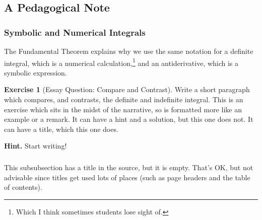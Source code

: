 \documentclass[10pt,]{article}
\theoremstyle{plain}
\theoremstyle{definition}
\theoremstyle{definition}
\theoremstyle{definition}
\theoremstyle{definition}
\theoremstyle{definition}
\theoremstyle{definition}
\newtheorem{exercise}[theorem]{Exercise}
\numberwithin{equation}{section}
\begin{document}
\subsection[{A Pedagogical Note}]{A Pedagogical Note}\label{subsection-2}
\typeout{************************************************}
\typeout{************************************************}
\subsubsection[{Symbolic and Numerical Integrals}]{Symbolic and Numerical Integrals}\label{subsubsection-different-integrals}
\hypertarget{p-47}{}%
The Fundamental Theorem explains why we use the same notation for a definite integral, which is a numerical calculation,\footnote{Which I think sometimes students lose sight of.\label{fn-2}} and an antiderivative, which is a symbolic expression.%
\begin{exercise}[{Essay Question: Compare and Contrast}]\label{exercise-essay}
\hypertarget{p-48}{}%
Write a short paragraph which compares, and contrasts, the definite and indefinite integral. This is an exercise which sits in the midst of the narrative, so is formatted more like an example or a remark.  It can have a hint and a solution, but this one does not.  It can have a title, which this one does.%
\par\smallskip%
\noindent\textbf{Hint.}\hypertarget{hint-1}{}\quad%
\hypertarget{p-49}{}%
Start writing!%
\end{exercise}
\typeout{************************************************}
\typeout{************************************************}
\subsubsection[{}]{}\label{subsubsection-2}
\hypertarget{p-50}{}%
This subsubsection has a title in the source, but it is empty.  That's OK, but not advisable since titles get used lots of places (such as page headers and the table of contents).%
\typeout{************************************************}
\typeout{************************************************}
\end{document}
